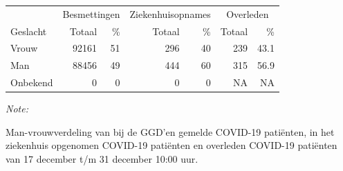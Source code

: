 \documentclass[
  english,
  man,floatsintext]{apa6}
\begin{document}
\begin{table}
\centering\begingroup\fontsize{11}{13}\selectfont

\begin{threeparttable}
\begin{tabular}{lrrrrrr}
\toprule
\multicolumn{1}{c}{ } & \multicolumn{2}{c}{Besmettingen} & \multicolumn{2}{c}{Ziekenhuisopnames} & \multicolumn{2}{c}{Overleden} \\
\cmidrule(l{3pt}r{3pt}){2-3} \cmidrule(l{3pt}r{3pt}){4-5} \cmidrule(l{3pt}r{3pt}){6-7}
Geslacht & Totaal & \% & Totaal & \% & Totaal & \%\\
\midrule
Vrouw & 92161 & 51 & 296 & 40 & 239 & 43.1\\
Man & 88456 & 49 & 444 & 60 & 315 & 56.9\\
Onbekend & 0 & 0 & 0 & 0 & NA & NA\\
\bottomrule
\end{tabular}
\begin{tablenotes}
\item \textit{Note: } 
\item Man-vrouwverdeling van bij de GGD’en gemelde COVID-19 patiënten, in het ziekenhuis opgenomen COVID-19 patiënten en overleden COVID-19 patiënten van 17 december t/m 31 december 10:00 uur.
\end{tablenotes}
\end{threeparttable}
\endgroup{}
\end{table}
\newpage
\end{document}
